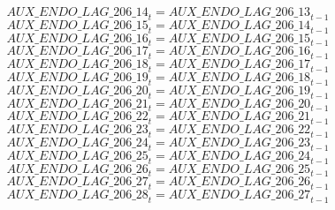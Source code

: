 \begin{dmath}
{AUX\_ENDO\_LAG\_206\_14}_{t}={AUX\_ENDO\_LAG\_206\_13}_{t-1}
\end{dmath}
\begin{dmath}
{AUX\_ENDO\_LAG\_206\_15}_{t}={AUX\_ENDO\_LAG\_206\_14}_{t-1}
\end{dmath}
\begin{dmath}
{AUX\_ENDO\_LAG\_206\_16}_{t}={AUX\_ENDO\_LAG\_206\_15}_{t-1}
\end{dmath}
\begin{dmath}
{AUX\_ENDO\_LAG\_206\_17}_{t}={AUX\_ENDO\_LAG\_206\_16}_{t-1}
\end{dmath}
\begin{dmath}
{AUX\_ENDO\_LAG\_206\_18}_{t}={AUX\_ENDO\_LAG\_206\_17}_{t-1}
\end{dmath}
\begin{dmath}
{AUX\_ENDO\_LAG\_206\_19}_{t}={AUX\_ENDO\_LAG\_206\_18}_{t-1}
\end{dmath}
\begin{dmath}
{AUX\_ENDO\_LAG\_206\_20}_{t}={AUX\_ENDO\_LAG\_206\_19}_{t-1}
\end{dmath}
\begin{dmath}
{AUX\_ENDO\_LAG\_206\_21}_{t}={AUX\_ENDO\_LAG\_206\_20}_{t-1}
\end{dmath}
\begin{dmath}
{AUX\_ENDO\_LAG\_206\_22}_{t}={AUX\_ENDO\_LAG\_206\_21}_{t-1}
\end{dmath}
\begin{dmath}
{AUX\_ENDO\_LAG\_206\_23}_{t}={AUX\_ENDO\_LAG\_206\_22}_{t-1}
\end{dmath}
\begin{dmath}
{AUX\_ENDO\_LAG\_206\_24}_{t}={AUX\_ENDO\_LAG\_206\_23}_{t-1}
\end{dmath}
\begin{dmath}
{AUX\_ENDO\_LAG\_206\_25}_{t}={AUX\_ENDO\_LAG\_206\_24}_{t-1}
\end{dmath}
\begin{dmath}
{AUX\_ENDO\_LAG\_206\_26}_{t}={AUX\_ENDO\_LAG\_206\_25}_{t-1}
\end{dmath}
\begin{dmath}
{AUX\_ENDO\_LAG\_206\_27}_{t}={AUX\_ENDO\_LAG\_206\_26}_{t-1}
\end{dmath}
\begin{dmath}
{AUX\_ENDO\_LAG\_206\_28}_{t}={AUX\_ENDO\_LAG\_206\_27}_{t-1}
\end{dmath}
